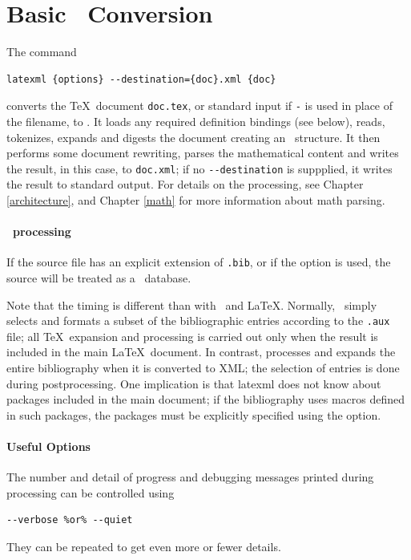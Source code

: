 \documentclass{book}
\newcommand{\shellcode}{\lstinline[style=shell]}
\begin{document}
\section[Conversion]{Basic \XML\ Conversion}\label{usage.conversion}
The command
\begin{lstlisting}[style=shell]
latexml {options} --destination={doc}.xml {doc}
\end{lstlisting}
converts the \TeX\ document \texttt{doc.tex},
or standard input if \texttt{-} is used in place of the filename, to \XML.
It loads any required definition bindings (see below),
reads, tokenizes, expands and digests the document creating an \XML\ structure.
It then performs some document rewriting, parses the mathematical content
and writes the result, in this case, to \texttt{doc.xml};
if no \shellcode|--destination| is suppplied, it writes the result to standard output.
For details on the processing, see Chapter \ref{architecture},
and Chapter \ref{math} for more information about math parsing.

\paragraph{\BibTeX\ processing}
If the source file has an explicit extension of \texttt{.bib},
or if the  option is used, the source will be
treated as a \BibTeX\ database.

Note that the timing is different than with \BibTeX\ and \LaTeX.
Normally, \BibTeX\ simply selects and formats a subset of the
bibliographic entries according to the \texttt{.aux} file;
all \TeX\ expansion and processing is carried out only when
the result is included in the main \LaTeX\ document.
In contrast,  processes and expands
the entire bibliography when it is converted to XML;
the selection of entries is done during postprocessing.
One implication is that latexml does not know about packages
included in the main document; if the bibliography uses
macros defined in such packages, the packages must be explicitly
specified using the  option.

\paragraph{Useful Options}
The number and detail of progress and debugging messages printed
during processing can be controlled using
\begin{lstlisting}[style=shell]
--verbose %or% --quiet
\end{lstlisting}
They can  be repeated to get even more or fewer details.
\end{document}
